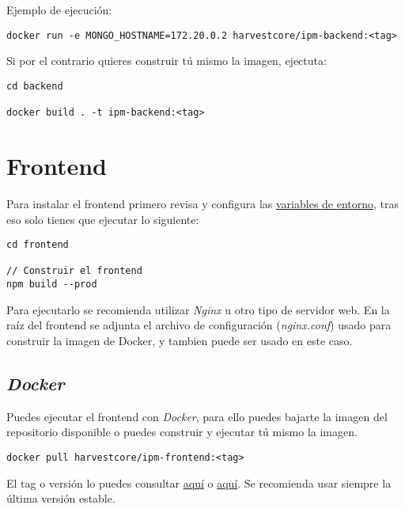 Ejemplo de ejecución:

\begin{lstlisting}
docker run -e MONGO_HOSTNAME=172.20.0.2 harvestcore/ipm-backend:<tag>
\end{lstlisting}

Si por el contrario quieres construir tú mismo la imagen, ejectuta:

\begin{lstlisting}
cd backend

docker build . -t ipm-backend:<tag>
\end{lstlisting}





\section{Frontend}

Para instalar el frontend primero revisa y configura las \hyperref[sec:variables]{variables de entorno}, tras eso solo tienes que ejecutar lo siguiente:

\begin{lstlisting}
cd frontend

// Construir el frontend
npm build --prod
\end{lstlisting}

Para ejecutarlo se recomienda utilizar \textit{Nginx} u otro tipo de servidor web. En la raíz del frontend se adjunta el archivo de configuración (\textit{nginx.conf}) usado para construir la imagen de Docker, y tambien puede ser usado en este caso.



\subsection{\textit{Docker}}

Puedes ejecutar el frontend con \textit{Docker}, para ello puedes bajarte la imagen del repositorio disponible o puedes construir y ejecutar tú mismo la imagen.

\begin{lstlisting}
docker pull harvestcore/ipm-frontend:<tag>
\end{lstlisting}

El tag o versión lo puedes consultar \href{https://github.com/harvestcore/tfg/releases}{aquí} o \href{https://hub.docker.com/r/harvestcore/ipm-frontend/tags}{aquí}. Se recomienda usar siempre la última versión estable.

